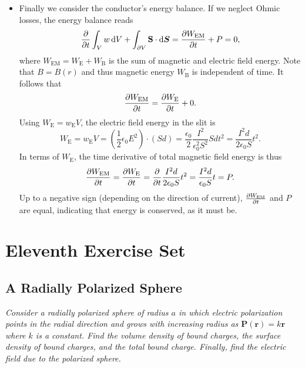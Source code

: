 \documentclass[11pt, a4paper]{article}
\newcommand{\diff}{\mathop{}\!\mathrm{d}} %
\renewcommand{\vec}[1]{\bm{#1}} %
\renewcommand{\r}{\vec{r}}
\renewcommand{\S}{\mathbf{S}}  %
\newcommand{\ee}{\epsilon_{0}}  %
\renewcommand{\P}{\vec{P}}  %
\begin{document}
\begin{itemize}
	\item  Finally we consider the conductor's energy balance. If we neglect Ohmic losses, the energy balance reads
	\begin{equation*}
		\pdv{t}\int_{V}w \diff V + \int_{\partial V} \S \cdot \diff \vec{S} = \pdv{W_{\text{EM}}}{t} + P = 0,
	\end{equation*}
	where $ W_{\text{EM}} = W_{\text{E}} + W_{\text{B}} $ is the sum of magnetic and electric field energy. Note that $ B = B(r)$  and thus magnetic energy $ W_{\text{B}} $ is independent of time. It follows that
	\begin{equation*}
		\pdv{W_{\text{EM}}}{t} = \pdv{W_{\text{E}}}{t} + 0.
	\end{equation*}
	Using $ W_{\text{E}} = w_{\text{E}}V $, the electric field energy in the slit is
	\begin{equation*}
		W_{\text{E}} = w_{\text{E}}V = \left(\frac{1}{2} \ee E^{2}\right) \cdot \left(Sd\right) = \frac{\ee}{2}\frac{I^{2}}{\ee^{2}S^{2}}Sdt^{2} = \frac{I^{2}d}{2\ee S}t^{2}.
	\end{equation*}
	In terms of $ W_{\text{E}} $, the time derivative of total magnetic field energy is thus
	\begin{equation*}
		\pdv{W_{\text{EM}}}{t} = \pdv{W_{\text{E}}}{t} = \pdv{t}\frac{I^{2}d}{2\ee S}t^{2} = \frac{I^{2}d}{\ee S} t = P.
	\end{equation*}
	Up to a negative sign (depending on the direction of current), $ \pdv{W_{\text{EM}}}{t} $ and $ P $ are equal, indicating that energy is conserved, as it must be.
\end{itemize}

\section{Eleventh Exercise Set}

\subsection{A Radially Polarized Sphere}
\textit{Consider a radially polarized sphere of radius $ a $ in which electric polarization points in the radial direction and grows with increasing radius as $ \P(\r) = k \r $ where $ k $ is a constant. Find the volume density of bound charges, the surface density of bound charges, and the total bound charge. Finally, find the electric field due to the polarized sphere.}
\end{document}
